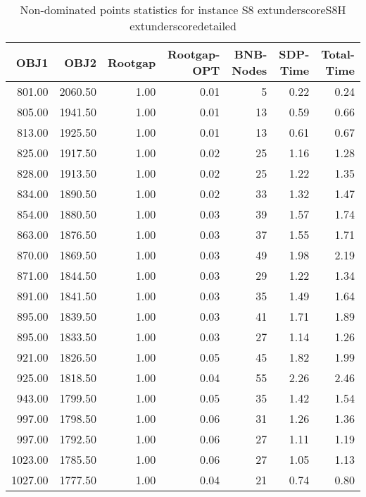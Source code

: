 \begin{table}
\caption{Non-dominated points statistics for instance S8	extunderscoreS8H	extunderscoredetailed}
\label{tab:stats/S8_S8H_detailed}
\begin{tabular}{rrrrrrr}
\toprule
OBJ1 & OBJ2 & Rootgap & Rootgap-OPT & BNB-Nodes & SDP-Time & Total-Time \\
\midrule
801.00 & 2060.50 & 1.00 & 0.01 & 5 & 0.22 & 0.24 \\
805.00 & 1941.50 & 1.00 & 0.01 & 13 & 0.59 & 0.66 \\
813.00 & 1925.50 & 1.00 & 0.01 & 13 & 0.61 & 0.67 \\
825.00 & 1917.50 & 1.00 & 0.02 & 25 & 1.16 & 1.28 \\
828.00 & 1913.50 & 1.00 & 0.02 & 25 & 1.22 & 1.35 \\
834.00 & 1890.50 & 1.00 & 0.02 & 33 & 1.32 & 1.47 \\
854.00 & 1880.50 & 1.00 & 0.03 & 39 & 1.57 & 1.74 \\
863.00 & 1876.50 & 1.00 & 0.03 & 37 & 1.55 & 1.71 \\
870.00 & 1869.50 & 1.00 & 0.03 & 49 & 1.98 & 2.19 \\
871.00 & 1844.50 & 1.00 & 0.03 & 29 & 1.22 & 1.34 \\
891.00 & 1841.50 & 1.00 & 0.03 & 35 & 1.49 & 1.64 \\
895.00 & 1839.50 & 1.00 & 0.03 & 41 & 1.71 & 1.89 \\
895.00 & 1833.50 & 1.00 & 0.03 & 27 & 1.14 & 1.26 \\
921.00 & 1826.50 & 1.00 & 0.05 & 45 & 1.82 & 1.99 \\
925.00 & 1818.50 & 1.00 & 0.04 & 55 & 2.26 & 2.46 \\
943.00 & 1799.50 & 1.00 & 0.05 & 35 & 1.42 & 1.54 \\
997.00 & 1798.50 & 1.00 & 0.06 & 31 & 1.26 & 1.36 \\
997.00 & 1792.50 & 1.00 & 0.06 & 27 & 1.11 & 1.19 \\
1023.00 & 1785.50 & 1.00 & 0.06 & 27 & 1.05 & 1.13 \\
1027.00 & 1777.50 & 1.00 & 0.04 & 21 & 0.74 & 0.80 \\
\bottomrule
\end{tabular}
\end{table}

